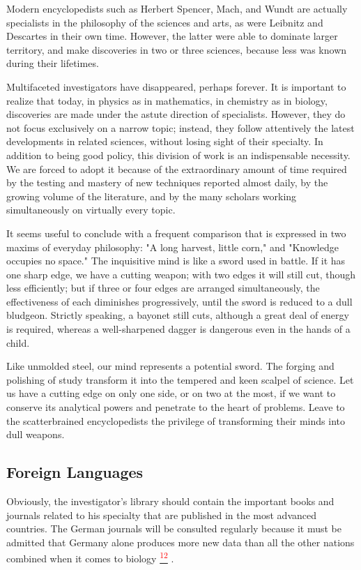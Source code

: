 \documentclass{article}
\newcommand{\noteref}[1]{%
 \hypertarget{ref:#1}{}%
 \hyperlink{note:#1}{\textsuperscript{\textcolor{red}{#1}}}%
}
\begin{document}
Modern encyclopedists such as Herbert Spencer, Mach, and Wundt are actually specialists in the philosophy of the sciences and arts, as were Leibnitz and Descartes in their own time. However, the latter were able to dominate larger territory, and make discoveries in two or three sciences, because less was known during their lifetimes.

Multifaceted investigators have disappeared, perhaps forever. It is important to realize that today, in physics as in mathematics, in chemistry as in biology, discoveries are made under the astute direction of specialists. However, they do not focus exclusively on a narrow topic; instead, they follow attentively the latest developments in related sciences, without losing sight of their specialty. In addition to being good policy, this division of work is an indispensable necessity. We are forced to adopt it because of the extraordinary amount of time required by the testing and mastery of new techniques reported almost daily, by the growing volume of the literature, and by the many scholars working simultaneously on virtually every topic.

It seems useful to conclude with a frequent comparison that is expressed in two maxims of everyday philosophy: "A long harvest, little corn," and "Knowledge occupies no space." The inquisitive mind is like a sword used in battle. If it has one sharp edge, we have a cutting weapon; with two edges it will still cut, though less efficiently; but if three or four edges are arranged simultaneously, the effectiveness of each diminishes progressively, until the sword is reduced to a dull bludgeon. Strictly speaking, a bayonet still cuts, although a great deal of energy is required, whereas a well-sharpened dagger is dangerous even in the hands of a child.

Like unmolded steel, our mind represents a potential sword. The forging and polishing of study transform it into the tempered and keen scalpel of science. Let us have a cutting edge on only one side, or on two at the most, if we want to conserve its analytical powers and penetrate to the heart of problems. Leave to the scatterbrained encyclopedists the privilege of transforming their minds into dull weapons.

\subsection*{Foreign Languages}

Obviously, the investigator’s library should contain the important books and journals related to his specialty that are published in the most advanced countries. The German journals will be consulted regularly because it must be admitted that Germany alone produces more new data than all the other nations combined when it comes to biology\noteref{12}.
\end{document}
